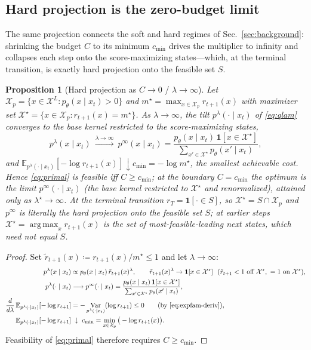 \documentclass{article}
\newtheorem{proposition}{Proposition}
\DeclareMathOperator{\Var}{Var}
\DeclareMathOperator*{\argmax}{arg\,max}
\newcommand{\E}{\mathbb{E}}
\newcommand{\X}{\mathcal{X}}
\newcommand{\lstar}{\lambda^{\star}}
\begin{document}
\subsection{Hard projection is the zero-budget limit}
The same projection connects the soft and hard regimes of Sec.~\ref{sec:background}: shrinking the budget $C$ to its minimum $c_{\min}$ drives the multiplier to infinity and collapses each step onto the score-maximizing states---which, at the terminal transition, is exactly hard projection onto the feasible set $S$.

\begin{proposition}[Hard projection as $C\to0$ / $\lambda\to\infty$]
\label{prop:hard}
Let $\X_p=\{x\in\X^L:p_\theta(x\mid x_t)>0\}$ and $m^\star=\max_{x\in\X_p}r_{t+1}(x)$ with maximizer set $\X^\star=\{x\in\X_p:r_{t+1}(x)=m^\star\}$. As $\lambda\to\infty$, the tilt $p^{\lambda}(\cdot\mid x_t)$ of \eqref{eq:qlam} converges to the base kernel restricted to the score-maximizing states,
\begin{equation}
p^{\lambda}(x\mid x_t)\ \xrightarrow{\lambda\to\infty}\
p^{\infty}(x\mid x_t)=\frac{p_\theta(x\mid x_t)\,\mathbf 1[x\in\X^\star]}{\sum_{x'\in\X^\star}p_\theta(x'\mid x_t)},
\end{equation}
and $\E_{p^{\lambda}(\cdot\mid x_t)}[-\log r_{t+1}(x)]\downarrow c_{\min}=-\log m^\star$, the smallest achievable cost. Hence \eqref{eq:primal} is feasible iff $C\ge c_{\min}$; at the boundary $C=c_{\min}$ the optimum is the limit $p^{\infty}(\cdot\mid x_t)$ (the base kernel restricted to $\X^\star$ and renormalized), attained only as $\lstar\to\infty$. At the terminal transition $r_T=\mathbf 1[\cdot\in S]$, so $\X^\star=S\cap\X_p$ and $p^{\infty}$ is literally the hard projection onto the feasible set $S$; at earlier steps $\X^\star=\argmax_x r_{t+1}(x)$ is the set of most-feasible-leading next states, which need not equal $S$.
\end{proposition}
\begin{proof}
Set $\tilde r_{t+1}(x)\coloneqq r_{t+1}(x)/m^\star\le1$ and let $\lambda\to\infty$:
\begin{align*}
p^{\lambda}(x\mid x_t)&\propto p_\theta(x\mid x_t)\,\tilde r_{t+1}(x)^{\lambda},
  \qquad \tilde r_{t+1}(x)^{\lambda}\to\mathbf 1[x\in\X^\star]\ \ (\tilde r_{t+1}<1\ \text{off}\ \X^\star,\ =1\ \text{on}\ \X^\star),\\
p^{\lambda}(\cdot\mid x_t)&\longrightarrow p^{\infty}(\cdot\mid x_t)=\frac{p_\theta(x\mid x_t)\,\mathbf 1[x\in\X^\star]}{\sum_{x'\in\X^\star}p_\theta(x'\mid x_t)},\\
\frac{d}{d\lambda}\,\E_{p^{\lambda}(\cdot\mid x_t)}[-\log r_{t+1}]
  &=-\Var_{p^{\lambda}(\cdot\mid x_t)}(\log r_{t+1})\le0
  \qquad(\text{by }\eqref{eq:expfam-deriv}),\\
\E_{p^{\lambda}(\cdot\mid x_t)}[-\log r_{t+1}]&\;\downarrow\;c_{\min}=\min_{x\in\X_p}\big(-\log r_{t+1}(x)\big).
\end{align*}
Feasibility of \eqref{eq:primal} therefore requires $C\ge c_{\min}$.
\end{proof}
\end{document}
